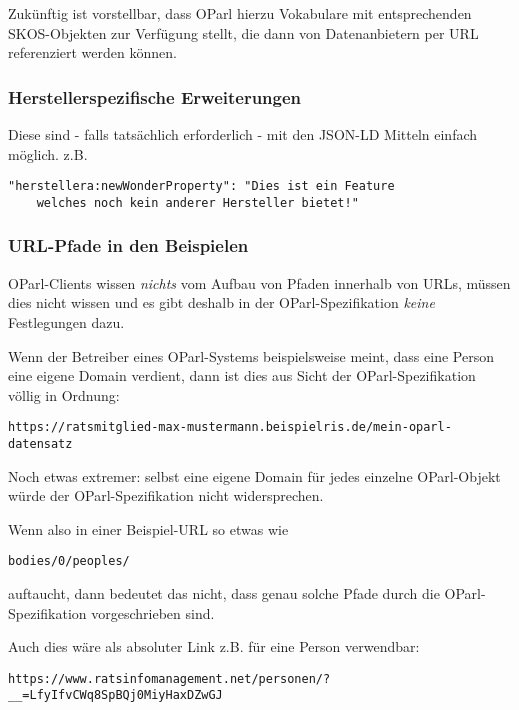 \documentclass[,a4paper]{article}
\begin{document}
Zukünftig ist vorstellbar, dass OParl hierzu Vokabulare mit
entsprechenden SKOS-Objekten zur Verfügung stellt, die dann von
Datenanbietern per URL referenziert werden können.

\subsubsection{Herstellerspezifische
Erweiterungen}\label{herstellerspezifische-erweiterungen}

Diese sind - falls tatsächlich erforderlich - mit den JSON-LD Mitteln
einfach möglich. z.B.

\begin{verbatim}
"herstellera:newWonderProperty": "Dies ist ein Feature
    welches noch kein anderer Hersteller bietet!"
\end{verbatim}

\subsubsection{URL-Pfade in den
Beispielen}\label{url-pfade-in-den-beispielen}

OParl-Clients wissen \emph{nichts} vom Aufbau von Pfaden innerhalb von
URLs, müssen dies nicht wissen und es gibt deshalb in der
OParl-Spezifikation \emph{keine} Festlegungen dazu.

Wenn der Betreiber eines OParl-Systems beispielsweise meint, dass eine
Person eine eigene Domain verdient, dann ist dies aus Sicht der
OParl-Spezifikation völlig in Ordnung:

\begin{verbatim}
https://ratsmitglied-max-mustermann.beispielris.de/mein-oparl-datensatz
\end{verbatim}

Noch etwas extremer: selbst eine eigene Domain für jedes einzelne
OParl-Objekt würde der OParl-Spezifikation nicht widersprechen.

Wenn also in einer Beispiel-URL so etwas wie

\begin{verbatim}
bodies/0/peoples/
\end{verbatim}

auftaucht, dann bedeutet das nicht, dass genau solche Pfade durch die
OParl-Spezifikation vorgeschrieben sind.

Auch dies wäre als absoluter Link z.B. für eine Person verwendbar:

\begin{verbatim}
https://www.ratsinfomanagement.net/personen/?__=LfyIfvCWq8SpBQj0MiyHaxDZwGJ
\end{verbatim}
\end{document}
